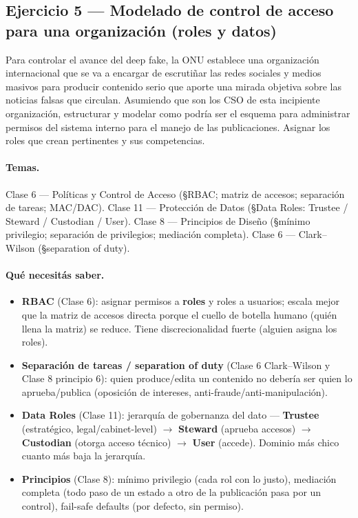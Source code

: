\subsection{Ejercicio 5 — Modelado de control de acceso para una organización (roles y datos)}

\begin{consigna}
Para controlar el avance del deep fake, la ONU establece una organización internacional que se va a encargar de escrutiñar las redes sociales y medios masivos para producir contenido serio que aporte una mirada objetiva sobre las noticias falsas que circulan. Asumiendo que son los CSO de esta incipiente organización, estructurar y modelar como podría ser el esquema para administrar permisos del sistema interno para el manejo de las publicaciones. Asignar los roles que crean pertinentes y sus competencias.
\end{consigna}

\paragraph{Temas.}
Clase 6 — Políticas y Control de Acceso (\S RBAC; matriz de accesos; separación de tareas; MAC/DAC). Clase 11 — Protección de Datos (\S Data Roles: Trustee / Steward / Custodian / User). Clase 8 — Principios de Diseño (\S mínimo privilegio; separación de privilegios; mediación completa). Clase 6 — Clark--Wilson (\S separation of duty).

\paragraph{Qué necesitás saber.}
\begin{itemize}
  \item \textbf{RBAC} (Clase 6): asignar permisos a \textbf{roles} y roles a usuarios; escala mejor que la matriz de accesos directa porque el cuello de botella humano (quién llena la matriz) se reduce. Tiene discrecionalidad fuerte (alguien asigna los roles).
  \item \textbf{Separación de tareas / separation of duty} (Clase 6 Clark--Wilson y Clase 8 principio 6): quien produce/edita un contenido no debería ser quien lo aprueba/publica (oposición de intereses, anti-fraude/anti-manipulación).
  \item \textbf{Data Roles} (Clase 11): jerarquía de gobernanza del dato — \textbf{Trustee} (estratégico, legal/cabinet-level) $\to$ \textbf{Steward} (aprueba accesos) $\to$ \textbf{Custodian} (otorga acceso técnico) $\to$ \textbf{User} (accede). Dominio más chico cuanto más baja la jerarquía.
  \item \textbf{Principios} (Clase 8): mínimo privilegio (cada rol con lo justo), mediación completa (todo paso de un estado a otro de la publicación pasa por un control), fail-safe defaults (por defecto, sin permiso).
\end{itemize}

